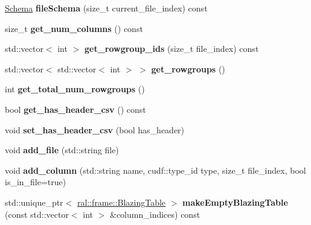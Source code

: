 \begin{DoxyCompactItemize}
\hyperlink{classral_1_1io_1_1Schema}{Schema} {\bfseries file\+Schema} (size\+\_\+t current\+\_\+file\+\_\+index) const
\item 
\mbox{\label{classral_1_1io_1_1Schema_af3517c3b2f3f41cac7d9f3b287408f4d}} 
size\+\_\+t {\bfseries get\+\_\+num\+\_\+columns} () const
\item 
\mbox{\label{classral_1_1io_1_1Schema_aac839b62501adda102c8b7257f9d5633}} 
std\+::vector$<$ int $>$ {\bfseries get\+\_\+rowgroup\+\_\+ids} (size\+\_\+t file\+\_\+index) const
\item 
\mbox{\label{classral_1_1io_1_1Schema_aaa7576bfb5d3458a5c4cfff78df78f1d}} 
std\+::vector$<$ std\+::vector$<$ int $>$ $>$ {\bfseries get\+\_\+rowgroups} ()
\item 
\mbox{\label{classral_1_1io_1_1Schema_a5248e9fa03b9d864959c96c8f82d99c7}} 
int {\bfseries get\+\_\+total\+\_\+num\+\_\+rowgroups} ()
\item 
\mbox{\label{classral_1_1io_1_1Schema_a2f130b5190211d97f912326944c6d63e}} 
bool {\bfseries get\+\_\+has\+\_\+header\+\_\+csv} () const
\item 
\mbox{\label{classral_1_1io_1_1Schema_a4f6aaf2fd0c6182b96ab07eb592cf21c}} 
void {\bfseries set\+\_\+has\+\_\+header\+\_\+csv} (bool has\+\_\+header)
\item 
\mbox{\label{classral_1_1io_1_1Schema_a7cc826068d65da7e2cea7ff57614d6a2}} 
void {\bfseries add\+\_\+file} (std\+::string file)
\item 
\mbox{\label{classral_1_1io_1_1Schema_a57b5cabad19de4a46507c734a9f6986a}} 
void {\bfseries add\+\_\+column} (std\+::string name, cudf\+::type\+\_\+id type, size\+\_\+t file\+\_\+index, bool is\+\_\+in\+\_\+file=true)
\item 
\mbox{\label{classral_1_1io_1_1Schema_a70957a4ea7b4ad480eb4b35539b5d395}} 
std\+::unique\+\_\+ptr$<$ \hyperlink{classral_1_1frame_1_1BlazingTable}{ral\+::frame\+::\+Blazing\+Table} $>$ {\bfseries make\+Empty\+Blazing\+Table} (const std\+::vector$<$ int $>$ \&column\+\_\+indices) const

\end{DoxyCompactItemize}
